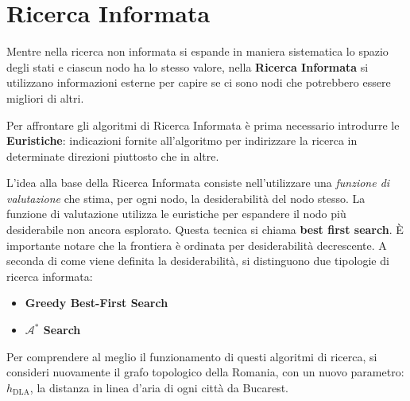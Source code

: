 \documentclass[a4paper, 11pt, oneside]{book}
\theoremstyle{definition}
\begin{document}
    \section{Ricerca Informata}
    Mentre nella ricerca non informata si espande in maniera sistematica lo spazio degli
    stati e ciascun nodo ha lo stesso valore, nella \textbf{Ricerca Informata} si utilizzano
    informazioni esterne per capire se ci sono nodi che potrebbero essere migliori di altri.

    Per affrontare gli algoritmi di Ricerca Informata \`e prima necessario introdurre
    le \textbf{Euristiche}: indicazioni fornite all'algoritmo per indirizzare la ricerca
    in determinate direzioni piuttosto che in altre.

    L'idea alla base della Ricerca Informata consiste nell'utilizzare una \emph{funzione
    di valutazione} che stima, per ogni nodo, la desiderabilit\`a del nodo stesso. La
    funzione di valutazione utilizza le euristiche per espandere il nodo pi\`u desiderabile
    non ancora esplorato. Questa tecnica si chiama \textbf{best first search}. \`E
    importante notare che la frontiera \`e ordinata per desiderabilit\`a decrescente.
    A seconda di come viene definita la desiderabilit\`a, si distinguono due tipologie di
    ricerca informata:
    \begin{itemize}
        \item \textbf{Greedy Best-First Search}
        \item \textbf{$\mathcal{A}^*$ Search}
    \end{itemize}
    
	Per comprendere al meglio il funzionamento di questi algoritmi di ricerca, si consideri
	nuovamente il grafo topologico della Romania, con un nuovo parametro: $h_{\text{DLA}}$,
	la distanza in linea d'aria di ogni citt\`a da Bucarest.
\end{document}
